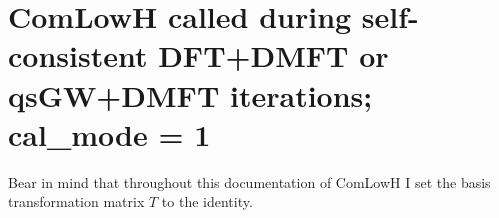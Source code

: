 \documentclass[aps,prb,singlecolumn,preprintnumbers,amsmath,amssymb]{revtex4}
\begin{document}



\section{ComLowH called during self-consistent DFT+DMFT or qsGW+DMFT iterations; cal\_mode = 1 }
Bear in mind that throughout this documentation of ComLowH I set the basis transformation matrix $T$ to the identity.
\end{document}

